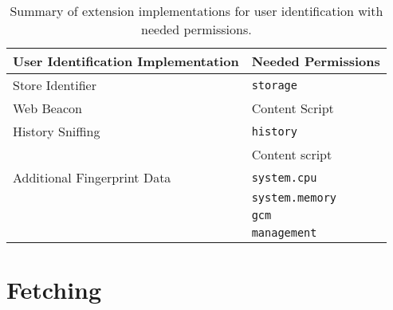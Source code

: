 	
	
	
	

	\begin{table}
		\centering
		\begin{tabular}{|l|l|} \hline 
			\textbf{User Identification Implementation} & \textbf{Needed Permissions} \\ \hline
			Store Identifier & \texttt{storage} \\
			\hline
			Web Beacon & Content Script \\
			\hline
			History Sniffing & \texttt{history} \\
			& Content script \\
			\hline
			Additional Fingerprint Data & \texttt{system.cpu} \\
			& \texttt{system.memory} \\
			& \texttt{gcm} \\
			& \texttt{management} \\
			\hline
		\end{tabular}
		\caption{Summary of extension implementations for user identification with needed permissions.}
		\label{tab:summaryUserIdentification}
	\end{table}

	
	
	
	
\newpage	
\section{Fetching}
\label{sec:fetching}
	
